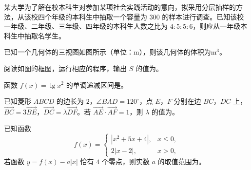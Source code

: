 \begin{question}
某大学为了解在校本科生对参加某项社会实践活动的意向，拟采用分层抽样的方法，从该校四个年级的本科生中抽取一个容量为 $300$ 的样本进行调查。已知该校一年级、二年级、三年级、四年级的本科生人数之比为 $4:5:5:6$，则应从一年级本科生中抽取\gkblank{}名学生。

\Needspace{0.4\textheight}
\end{question}
\begin{question}
已知一个几何体的三视图如图所示（单位：m），则该几何体的体积为\gkblank{}$\mathrm m^3$。
\nopagebreak[4]
\begin{center}\end{center}
\nopagebreak[4]
\Needspace{0.4\textheight}
\end{question}
\begin{question}
阅读如图的框图，运行相应的程序，输出 $S$ 的值为\gkblank{}。
\nopagebreak[4]
\begin{center}\end{center}
\nopagebreak[4]
\end{question}
\begin{question}
函数 $f(x)=\lg x^2$ 的单调递减区间是\gkblank{}。

\end{question}
\begin{question}
已知菱形 $ABCD$ 的边长为 $2$，$\angle BAD=120^\circ$，点 $E$，$F$ 分别在边 $BC$，$DC$ 上，$\overrightarrow{BC}=3\overrightarrow{BE}$，$\overrightarrow{DC}=\lambda\overrightarrow{DF}$。若 $\overrightarrow{AE}\cdot\overrightarrow{AF}=1$，则 $\lambda$ 的值为\gkblank{}。

\end{question}
\begin{question}
已知函数
\nopagebreak[4]
\[f(x)=\begin{cases}
|x^2+5x+4|, & x\leqslant 0,\\
2|x-2|, & x>0,
\end{cases}\]
若函数 $y=f(x)-a|x|$ 恰有 $4$ 个零点，则实数 $a$ 的取值范围为\gkblank{}。

\end{question}

